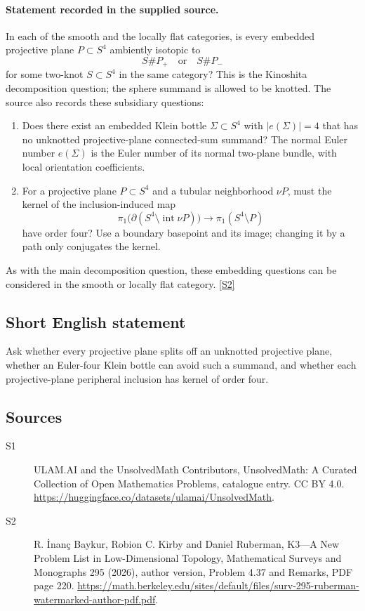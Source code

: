\documentclass[11pt]{article}
\newcommand{\sref}[2]{\hyperlink{source:#1:#2}{[S#2]}}
\begin{document}
\paragraph{Statement recorded in the supplied source.}
In each of the smooth and the locally flat categories, is every embedded projective plane $P\subset S^4$ ambiently isotopic to
\[
S\#P_+\quad\text{or}\quad S\#P_-
\]
for some two-knot $S\subset S^4$ in the same category? This is the Kinoshita decomposition question; the sphere summand is allowed to be knotted. The source also records these subsidiary questions:
\begin{enumerate}
\item[(i)] Does there exist an embedded Klein bottle $\Sigma\subset S^4$ with $|e(\Sigma)|=4$ that has no unknotted projective-plane connected-sum summand? The normal Euler number $e(\Sigma)$ is the Euler number of its normal two-plane bundle, with local orientation coefficients.
\item[(ii)] For a projective plane $P\subset S^4$ and a tubular neighborhood $\nu P$, must the kernel of the inclusion-induced map
\[
\pi_1\bigl(\partial(S^4\setminus\operatorname{int}\nu P)\bigr)
\longrightarrow\pi_1(S^4\setminus P)
\]
have order four? Use a boundary basepoint and its image; changing it by a path only conjugates the kernel.
\end{enumerate}
As with the main decomposition question, these embedding questions can be considered in the smooth or locally flat category. \sref{statement}{2}
\subsection{Short English statement}
Ask whether every projective plane splits off an unknotted projective plane, whether an Euler-four Klein bottle can avoid such a summand, and whether each projective-plane peripheral inclusion has kernel of order four.
\subsection{Sources}
\begin{description}
\item[\hypertarget{source:statement:1}{S1}] ULAM.AI and the UnsolvedMath Contributors, UnsolvedMath: A Curated Collection of Open Mathematics Problems, catalogue entry. CC BY 4.0. \url{https://huggingface.co/datasets/ulamai/UnsolvedMath}.
\item[\hypertarget{source:statement:2}{S2}] R. İnanç Baykur, Robion C. Kirby and Daniel Ruberman, K3—A New Problem List in Low-Dimensional Topology, Mathematical Surveys and Monographs 295 (2026), author version, Problem 4.37 and Remarks, PDF page 220. \url{https://math.berkeley.edu/sites/default/files/surv-295-ruberman-watermarked-author-pdf.pdf}.
\end{description}
\label{end:statement}
\end{document}
